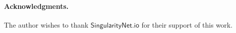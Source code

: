 \paragraph{Acknowledgments.}
The author wishes to thank $\mathsf{SingularityNet.io}$ for their support of this work.
